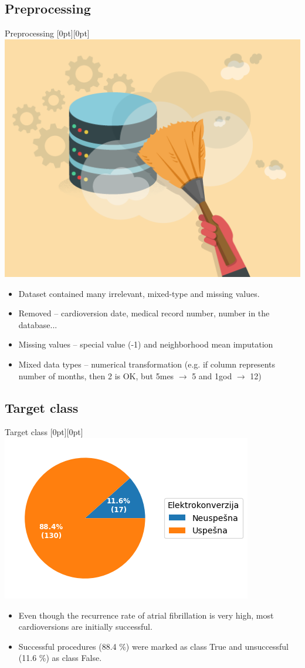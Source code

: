 \documentclass[hyperref={bookmarks=false}]{beamer}
\newcommand{\lenitem}[2][.51\linewidth]{\parbox[t]{#1}{\strut #2\strut}}
\begin{document}
\subsection{Preprocessing}
\begin{frame}{Preprocessing}
\mbox{}\hfill\raisebox{-\height}[0pt][0pt]{\includegraphics[width=.42\linewidth]{prep.png}}
\vspace*{-\baselineskip}

\begin{itemize}
    \item \lenitem{Dataset contained many irrelevant, mixed-type and missing values.}

    \item \lenitem{Removed -- cardioversion date, medical record number, number in the database...}

    \item \lenitem{Missing values -- special value (-1) and neighborhood mean imputation}

    \item \lenitem{Mixed data types -- numerical transformation (e.g. if column represents number of months, then 2 is OK, but 5mes $\rightarrow$ 5 and 1god $\rightarrow$ 12)}
\end{itemize}
\end{frame}

\subsection{Target class}
\begin{frame}{Target class}
\mbox{}\hfill\raisebox{-\height}[0pt][0pt]{\includegraphics[width=.42\linewidth]{target.png}}
\vspace*{-\baselineskip}

\begin{itemize}
    \item \lenitem{Even though the recurrence rate of atrial fibrillation is very high, most cardioversions are initially successful.}

    \item \lenitem{Successful procedures (88.4 \%) were marked as class True and unsuccessful (11.6 \%) as class False.}
\end{itemize}
\end{frame}
\end{document}
